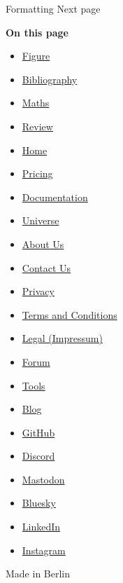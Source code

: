 { Formatting } { Next page }

\textbf{On this page}

\begin{itemize}
\tightlist
\item
  \hyperref[figure]{Figure}
\item
  \hyperref[bibliography]{Bibliography}
\item
  \hyperref[maths]{Maths}
\item
  \hyperref[review]{Review}
\end{itemize}

\begin{itemize}
\tightlist
\item
  \href{/}{Home}
\item
  \href{/pricing/}{Pricing}
\item
  \href{/docs/}{Documentation}
\item
  \href{/universe/}{Universe}
\item
  \href{/about/}{About Us}
\item
  \href{/contact/}{Contact Us}
\item
  \href{/privacy/}{Privacy}
\item
  \href{https://typst.app/terms}{Terms and Conditions}
\item
  \href{/legal/}{Legal (Impressum)}
\end{itemize}

\begin{itemize}
\tightlist
\item
  \href{https://forum.typst.app}{Forum}
\item
  \href{/tools/}{Tools}
\item
  \href{/blog/}{Blog}
\item
  \href{https://github.com/typst/}{GitHub}
\item
  \href{https://discord.gg/2uDybryKPe}{Discord}
\item
  \href{https://mastodon.social/@typst}{Mastodon}
\item
  \href{https://bsky.app/profile/typst.app}{Bluesky}
\item
  \href{https://www.linkedin.com/company/typst/}{LinkedIn}
\item
  \href{https://instagram.com/typstapp/}{Instagram}
\end{itemize}

Made in Berlin

